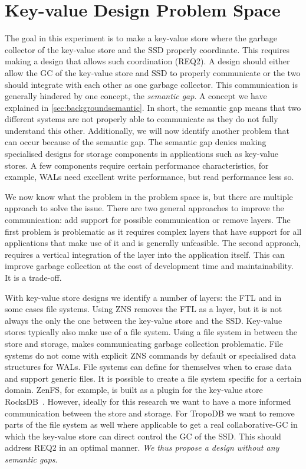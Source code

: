 \section{Key-value Design Problem Space}
 The goal in this experiment is to make a key-value store where the garbage collector of the key-value store and the SSD properly coordinate. This requires making a design that allows such coordination (REQ2). A design should either allow the GC of the key-value store and SSD to properly communicate or the two should integrate with each other as one garbage collector. This communication is generally hindered by one concept, the \textit{semantic gap}. A concept we have explained in \autoref{sec:backgroundsemantic}.  In short, the semantic gap means that two different systems are not properly able to communicate as they do not fully understand this other. Additionally, we will now identify another problem that can occur because of the semantic gap. The semantic gap denies making specialised designs for storage components in applications such as key-value stores. A few components require certain performance characteristics, for example, WALs need excellent write performance, but read performance less so.
 
 We now know what the problem in the problem space is, but there are multiple approach to solve the issue.
 There are two general approaches to improve the communication: add support for possible communication or remove layers. The first problem is problematic as it requires complex layers that have support for all applications that make use of it and is generally unfeasible. The second approach, requires a vertical integration of the layer into the application itself. This can improve garbage collection at the cost of development time and maintainability. It is a trade-off.  
 
 With key-value store designs we identify a number of layers: the FTL and in some cases file systems. Using ZNS removes the FTL as a layer, but it is not always the only the one between the key-value store and the SSD. Key-value stores typically also make use of a file system. Using a file system in between the store and storage, makes communicating garbage collection problematic. File systems do not come with explicit ZNS commands by default or specialised data structures for WALs. File systems can define for themselves when to erase data and support generic files. It is possible to create a file system specific for a certain domain. ZenFS, for example, is built as a plugin for the key-value store RocksDB~\cite{bjorling2021zns}. However, ideally for this research we want to have a more informed communication between the store and storage. For TropoDB we want to remove parts of the file system as well where applicable to get a real collaborative-GC in which the key-value store can direct control the GC of the SSD. This should address REQ2 in an optimal manner. \textit{We thus propose a design without any semantic gaps}. 


